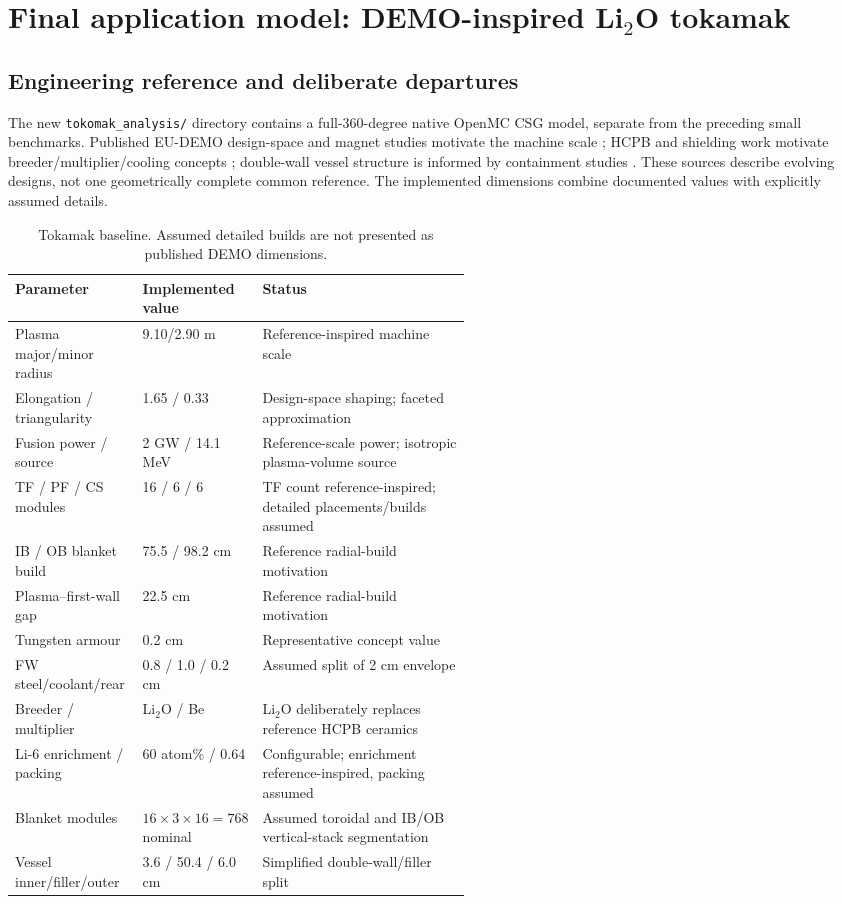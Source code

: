 \section{Final application model: DEMO-inspired \texorpdfstring{Li$_2$O}{Li2O} tokamak}
\label{sec:tokamak}
\subsection{Engineering reference and deliberate departures}
The new \texttt{tokomak\_analysis/} directory contains a full-360-degree native OpenMC CSG model, separate from the preceding small benchmarks. Published EU-DEMO design-space and magnet studies motivate the machine scale \citep{demodesign,magnets}; HCPB and shielding work motivate breeder/multiplier/cooling concepts \citep{hcpb,shielding}; double-wall vessel structure is informed by containment studies \citep{vessel}. These sources describe evolving designs, not one geometrically complete common reference. The implemented dimensions combine documented values with explicitly assumed details.

\begin{table}[tbp]\centering\small
\caption{Tokamak baseline. Assumed detailed builds are not presented as published DEMO dimensions.}
\begin{tabularx}{\linewidth}{p{0.29\linewidth}p{0.24\linewidth}X}
\toprule Parameter & Implemented value & Status\\\midrule
Plasma major/minor radius & 9.10/2.90 m & Reference-inspired machine scale\\
Elongation / triangularity & 1.65 / 0.33 & Design-space shaping; faceted approximation\\
Fusion power / source & 2 GW / 14.1 MeV & Reference-scale power; isotropic plasma-volume source\\
TF / PF / CS modules & 16 / 6 / 6 & TF count reference-inspired; detailed placements/builds assumed\\
IB / OB blanket build & 75.5 / 98.2 cm & Reference radial-build motivation\\
Plasma--first-wall gap & 22.5 cm & Reference radial-build motivation\\
Tungsten armour & 0.2 cm & Representative concept value\\
FW steel/coolant/rear & 0.8 / 1.0 / 0.2 cm & Assumed split of 2 cm envelope\\
Breeder / multiplier & Li$_2$O / Be & Li$_2$O deliberately replaces reference HCPB ceramics\\
Li-6 enrichment / packing & 60 atom\% / 0.64 & Configurable; enrichment reference-inspired, packing assumed\\
Blanket modules & $16\times3\times16=768$ nominal & Assumed toroidal and IB/OB vertical-stack segmentation\\
Vessel inner/filler/outer & 3.6 / 50.4 / 6.0 cm & Simplified double-wall/filler split\\
\bottomrule
\end{tabularx}\end{table}

